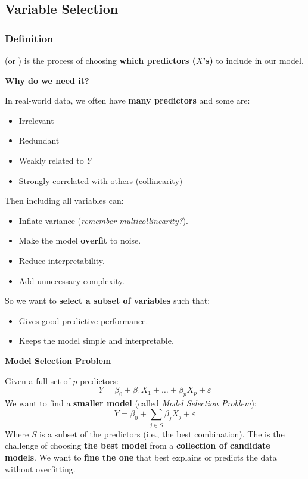 \subsection{Variable Selection}

\subsubsection{Definition}

 (or ) is the process of choosing \textbf{which predictors ($X$'s)} to include in our model.

\highspace
\begin{flushleft}
    \textcolor{Green3}{ \textbf{Why do we need it?}}
\end{flushleft}
In real-world data, we often have \textbf{many predictors} and some are:
\begin{itemize}
    \item Irrelevant
    \item Redundant
    \item Weakly related to $Y$
    \item Strongly correlated with others (collinearity)
\end{itemize}
Then including all variables can:
\begin{itemize}[label=\textcolor{Red2}{}]
    \item Inflate variance (\emph{remember multicollinearity?}).
    \item Make the model \textbf{overfit} to noise.
    \item Reduce interpretability.
    \item Add unnecessary complexity.
\end{itemize}
So we want to \textbf{select a subset of variables} such that:
\begin{itemize}[label=\textcolor{Green3}{}]
    \item Gives good predictive performance.
    \item Keeps the model simple and interpretable.
\end{itemize}

\highspace
\begin{flushleft}
    \textcolor{Red2}{ \textbf{Model Selection Problem}}
\end{flushleft}
Given a full set of $p$ predictors:
\begin{equation*}
    Y = \beta_0 + \beta_1 X_1 + \dots + \beta_p X_p + \varepsilon
\end{equation*}
We want to find a \textbf{smaller model} (called \emph{Model Selection Problem}):
\begin{equation*}
    Y = \beta_0 + \sum_{j \in S} \beta_j X_j + \varepsilon
\end{equation*}
Where $S$ is a subset of the predictors (i.e., the best combination). The  is the challenge of choosing \textbf{the best model} from a \textbf{collection of candidate models}. We want to \textbf{fine the one} that best explains or predicts the data without overfitting.

